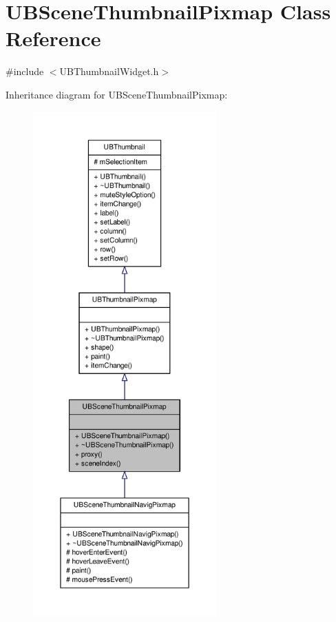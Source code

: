 \hypertarget{class_u_b_scene_thumbnail_pixmap}{\section{U\-B\-Scene\-Thumbnail\-Pixmap Class Reference}
\label{d1/d64/class_u_b_scene_thumbnail_pixmap}
}


{\ttfamily \#include $<$U\-B\-Thumbnail\-Widget.\-h$>$}



Inheritance diagram for U\-B\-Scene\-Thumbnail\-Pixmap\-:
\nopagebreak
\begin{figure}[H]
\begin{center}
\leavevmode
\includegraphics[height=550pt]{de/df4/class_u_b_scene_thumbnail_pixmap__inherit__graph}
\end{center}
\end{figure}


